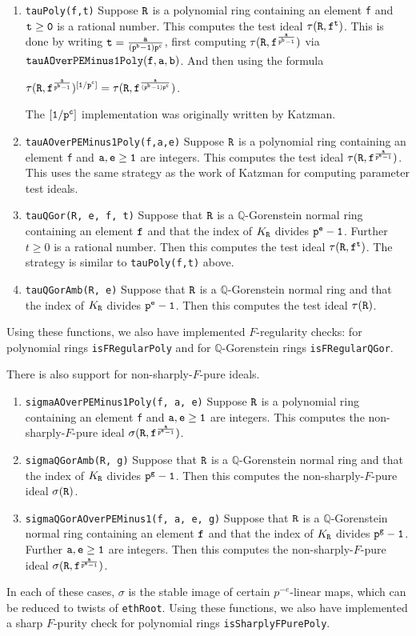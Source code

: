 \documentclass[11pt,fullpage]{amsart}
\theoremstyle{definition}
\theoremstyle{remark}
\newcommand{\bQ}{\mathbb{Q}}
\begin{document}
\begin{enumerate}
\item {\tt tauPoly(f,t)}  Suppose ${\tt R}$ is a polynomial ring containing an element {\tt f} and ${\tt t \geq 0}$ is a rational number.  This computes the test ideal ${\tt \tau(R, f^t)}$.  This is done by writing ${\tt t = {a \over (p^b - 1)p^c}}$, first computing ${\tt \tau(R, f^{a\over p^b-1})}$ via ${\tt tauAOverPEMinus1Poly(f,a,b)}$.  And then using the formula
    \begin{center}
    ${\tt \tau(R, f^{a\over p^b-1})^{[1/p^c]} = \tau(R, f^{a\over (p^b-1)p^c})}$.
    \end{center}
    The ${\tt [1/p^c]}$ implementation was originally written by Katzman.
\item {\tt tauAOverPEMinus1Poly(f,a,e)}  Suppose ${\tt R}$ is a polynomial ring containing an element {\tt f} and ${\tt a,e \geq 1}$ are integers.  This computes the test ideal ${\tt \tau(R, f^{a \over p^e -1})}$.  This uses the same strategy as the work of Katzman for computing parameter test ideals.
\item {\tt tauQGor(R, e, f, t)}  Suppose that ${\tt R}$ is a $\bQ$-Gorenstein normal ring containing an element ${\tt f}$ and that the index of $K_{\tt R}$ divides ${\tt p^e - 1}$.  Further $t \geq 0$ is a rational number.  Then this computes the test ideal ${\tt \tau(R, f^t)}$.  The strategy is similar to {\tt tauPoly(f,t)} above.
\item {\tt tauQGorAmb(R, e)}  Suppose that ${\tt R}$ is a $\bQ$-Gorenstein normal ring and that the index of $K_{\tt R}$ divides ${\tt p^e - 1}$.  Then this computes the test ideal ${\tt \tau(R)}$.
\end{enumerate}

Using these functions, we also have implemented $F$-regularity checks:  for polynomial rings {\tt isFRegularPoly} and for $\bQ$-Gorenstein rings {\tt isFRegularQGor}.

There is also support for non-sharply-$F$-pure ideals.
\begin{enumerate}
\item {\tt sigmaAOverPEMinus1Poly(f, a, e)} Suppose ${\tt R}$ is a polynomial ring containing an element {\tt f} and ${\tt a,e \geq 1}$ are integers.  This computes the non-sharply-$F$-pure ideal ${\tt \sigma(R, f^{a \over p^e - 1})}$.
\item {\tt sigmaQGorAmb(R, g)}  Suppose that ${\tt R}$ is a $\bQ$-Gorenstein normal ring and that the index of $K_{\tt R}$ divides ${\tt p^g - 1}$.  Then this computes the non-sharply-$F$-pure ideal ${\tt \sigma(R)}$.
\item {\tt sigmaQGorAOverPEMinus1(f, a, e, g)}  Suppose that ${\tt R}$ is a $\bQ$-Gorenstein normal ring containing an element ${\tt f}$ and that the index of $K_{\tt R}$ divides ${\tt p^g - 1}$.  Further ${\tt a,e \geq 1}$ are integers.  Then this computes the non-sharply-$F$-pure ideal ${\tt \sigma(R, f^{a \over p^e - 1})}$.
\end{enumerate}
In each of these cases, $\sigma$ is the stable image of certain $p^{-e}$-linear maps, which can be reduced to twists of {\tt ethRoot}.  Using these functions, we also have implemented a sharp $F$-purity check for polynomial rings {\tt isSharplyFPurePoly}.
\end{document}
